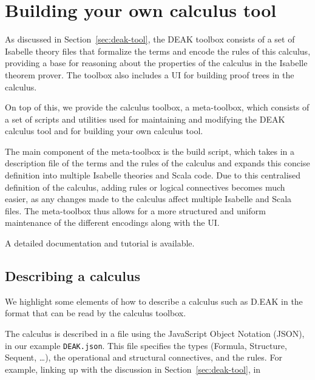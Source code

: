 \documentclass[runningheads,a4paper]{llncs}
\begin{document}
\section{Building your own calculus tool}\label{sec:meta-tool}
As discussed in Section~\ref{sec:deak-tool}, the DEAK toolbox consists of a set of Isabelle theory files that formalize the terms and encode the rules of this calculus, providing a base for reasoning about the properties of the calculus in the Isabelle theorem prover. The toolbox also includes a UI for building proof trees in the calculus.

On top of this, we provide the calculus toolbox, a meta-toolbox, which consists of a set of scripts and utilities used for maintaining and modifying the DEAK calculus tool and for building your own calculus tool.



The main component of the meta-toolbox is the build script, which takes in a description file of the terms and the rules of the calculus and expands this concise definition into multiple Isabelle theories and Scala code. Due to this centralised definition of the calculus, adding rules or logical connectives becomes much easier, as any changes made to the calculus affect multiple Isabelle and Scala files. The meta-toolbox thus allows for a more structured and uniform maintenance of the different encodings along with the UI.

A detailed documentation \cite{Balco:CT} and tutorial \cite{Balco:tutorial} is available.


\subsection{Describing a calculus}
We highlight some elements of how to describe a calculus such as D.EAK in the format that can be read by the calculus toolbox. 

The calculus is described in a file using the JavaScript Object Notation (JSON), in our example \texttt{DEAK.json}. This file specifies the types (Formula, Structure, Sequent, \dots), the operational and structural connectives, and the rules. For example, linking up with the discussion in Section~\ref{sec:deak-tool}, in

\begin{pyglist}[language = json]
"Sequent": {
  "type" : ["Structure", "Structure"],
  "isabelle" : "_ \\<turnstile> _",
  "ascii" : "_ |- _",
  "latex" : "_ {\\ {\\textcolor{magenta}\\boldsymbol{\\vdash}\\ } _",
  "precedence": [311,311,310]
\end{pyglist}
\end{document}
